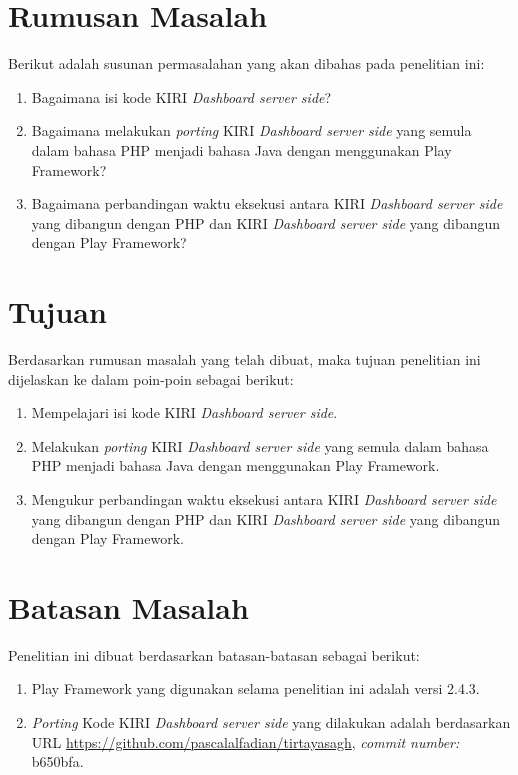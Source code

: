 \section{Rumusan Masalah}
\label{sec:rumusan_masalah}
Berikut adalah susunan permasalahan yang akan dibahas pada penelitian ini:
	\begin{enumerate}
		\item Bagaimana isi kode KIRI \textit{Dashboard server side}?
		\item Bagaimana melakukan \textit{porting} KIRI \textit{Dashboard server side} yang semula dalam bahasa PHP menjadi bahasa Java dengan menggunakan Play Framework?
		\item Bagaimana perbandingan waktu eksekusi antara KIRI \textit{Dashboard server side} yang dibangun dengan PHP dan KIRI \textit{Dashboard server side} yang dibangun dengan Play Framework?
	\end{enumerate}
	
\section{Tujuan}
\label{sec:tujuan}
Berdasarkan rumusan masalah yang telah dibuat, maka tujuan penelitian ini dijelaskan ke dalam poin-poin sebagai berikut:
	\begin{enumerate}
		\item Mempelajari isi kode KIRI \textit{Dashboard server side}.
		\item Melakukan \textit{porting} KIRI \textit{Dashboard server side} yang semula dalam bahasa PHP menjadi bahasa Java dengan menggunakan Play Framework.
		\item Mengukur perbandingan waktu eksekusi antara KIRI \textit{Dashboard server side} yang dibangun dengan PHP dan KIRI \textit{Dashboard server side} yang dibangun dengan Play Framework.
	\end{enumerate}
	
\section{Batasan Masalah}
\label{sec:batasan_masalah}
Penelitian ini dibuat berdasarkan batasan-batasan sebagai berikut:
	\begin{enumerate}
		\item Play Framework yang digunakan selama penelitian ini adalah versi 2.4.3.
		\item \textit{Porting} Kode KIRI \textit{Dashboard server side} yang dilakukan adalah berdasarkan URL \url{https://github.com/pascalalfadian/tirtayasagh}, \textit{commit number:} b650bfa.
	\end{enumerate}
	
